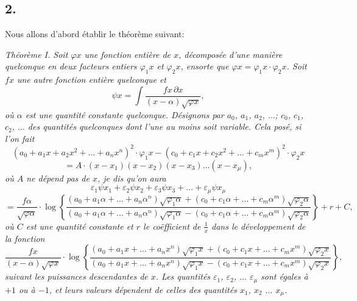\documentclass{article}
\begin{document}
\subsection*{2.}

Nous allons d'abord établir le théorème suivant:

\emph{Théorème I. Soit $\varphi x$ une fonction entière de $x$, décomposée d'une manière quelconque en deux facteurs entiers $\varphi_1 x$ et $\varphi_2 x$, ensorte que $\varphi x = \varphi_1 x \cdot \varphi_2 x$. Soit $fx$ une autre fonction entière quelconque et}
\[ \psi x = \int \frac{fx \, \partial x}{(x-\alpha)\sqrt{\varphi x}}, \tag{2} \]
\emph{où $\alpha$ est une quantité constante quelconque. Désignons par $a_0$, $a_1$, $a_2$, $\ldots$; $c_0$, $c_1$, $c_2$, $\ldots$ des quantités quelconques dont l'une au moins soit variable. Cela posé, si l'on fait}
\[ (a_0+a_1x+a_2x^{2}+\ldots+a_nx^{n})^{2} \cdot \varphi_1 x-(c_0+c_1x+c_2x^{2}+\ldots+c_mx^{m})^{2} \cdot \varphi_2 x \tag{3} \]
\[ = A \cdot (x-x_1)(x-x_2)(x-x_3)\ldots(x-x_\mu), \]
\emph{où $A$ ne dépend pas de $x$, je dis qu'on aura}
\[ \varepsilon_1\psi x_1 + \varepsilon_2\psi x_2 + \varepsilon_3\psi x_3 + \ldots + \varepsilon_\mu\psi x_\mu \tag{4} \]
\[ = \frac{f\alpha}{\sqrt{\varphi\alpha}} \cdot \log\left\{\frac{(a_0+a_1\alpha+\ldots+a_n\alpha^{n})\sqrt{\varphi_1\alpha}+(c_0+c_1\alpha+\ldots+c_m\alpha^{m})\sqrt{\varphi_2\alpha}}{(a_0+a_1\alpha+\ldots+a_n\alpha^{n})\sqrt{\varphi_1\alpha}-(c_0+c_1\alpha+\ldots+c_m\alpha^{m})\sqrt{\varphi_2\alpha}}\right\}+r+C, \]
\emph{où $C$ est une quantité constante et $r$ le coëfficient de $\frac{1}{x}$ dans le développement de la fonction}
\[ \frac{fx}{(x-\alpha)\sqrt{\varphi x}} \cdot \log\left\{\frac{(a_0+a_1x+\ldots+a_nx^{n})\sqrt{\varphi_1 x}+(c_0+c_1x+\ldots+c_mx^{m})\sqrt{\varphi_2 x}}{(a_0+a_1x+\ldots+a_nx^{n})\sqrt{\varphi_1 x}-(c_0+c_1x+\ldots+c_mx^{m})\sqrt{\varphi_2 x}}\right\}, \]
\emph{suivant les puissances descendantes de $x$. Les quantités $\varepsilon_1$, $\varepsilon_2$, $\ldots$ $\varepsilon_\mu$ sont égales à $+1$ ou à $-1$, et leurs valeurs dépendent de celles des quantités $x_1$, $x_2$ $\ldots$ $x_\mu$.}
\end{document}
